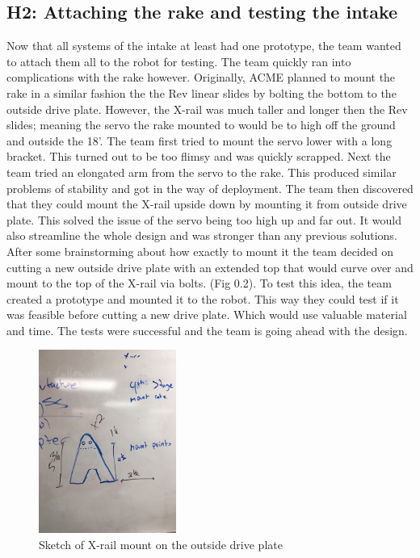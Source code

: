 \documentclass{article}
\begin{document}
\subsection{H2: Attaching the rake and testing the intake}

Now that all systems of the intake at least had one prototype, the team wanted to attach them all to the robot for testing. The team quickly ran into complications with the rake however. Originally, ACME planned to mount the rake in a similar fashion the the Rev linear slides by bolting the bottom to the outside drive plate. However, the X-rail was much taller and longer then the Rev slides; meaning the servo the rake mounted to would be to high off the ground and outside the 18'. The team first tried to mount the servo lower with a long bracket. This turned out to be too flimsy and was quickly scrapped. Next the team tried an elongated arm from the servo to the rake. This produced similar problems of stability and got in the way of deployment. The team then discovered that they could mount the X-rail upside down by mounting it from outside drive plate. This solved the issue of the servo being too high up and far out. It would also streamline the whole design and was stronger than any previous solutions. After some brainstorming about how exactly to mount it the team decided on cutting a new outside drive plate with an extended top that would curve over and mount to the top of the X-rail via bolts. (Fig 0.2). To test this idea, the team created a prototype and mounted it to the robot. This way they could test if it was feasible before cutting a new drive plate. Which would use valuable material and time. The tests were successful and the team is going ahead with the design. 

\begin{figure}
    \centering
    \includegraphics[height=6cm]{16_12-17/images/x-rail_mount.JPG}
    \caption{Sketch of X-rail mount on the outside drive plate}
    \label{fig:Mount Sketch}
\end{figure}
\end{document}
